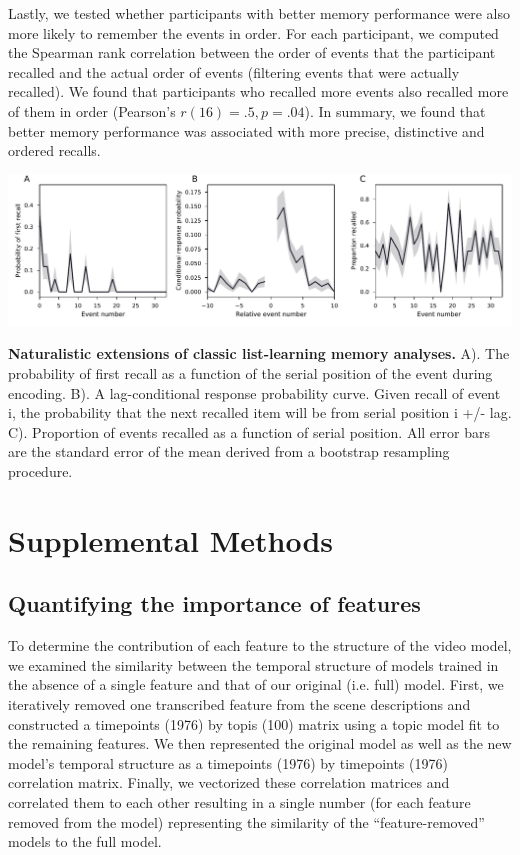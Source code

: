 \documentclass{article}
\begin{document}
Lastly, we tested whether participants with better memory performance were also more likely to remember the events in order.  For each participant, we computed the Spearman rank correlation between the order of events that the participant recalled and the actual order of events (filtering events that were actually recalled).  We found that participants who recalled more events also recalled more of them in order (Pearson's $r(16)=.5, p=.04$). In summary, we found that better memory performance was associated with more precise, distinctive and ordered recalls.

\begin{suppfigure}[t!]
\centering
\includegraphics[width=1\textwidth]{figs/supp3_list_learning.pdf}
\caption{\small \textbf{Naturalistic extensions of classic list-learning memory analyses.} A). The probability of first recall as a function of the serial position of the event during encoding. B). A lag-conditional response probability curve. Given recall of event i, the probability that the next recalled item will be from serial position i +/- lag. C). Proportion of events recalled as a function of serial position. All error bars are the standard error of the mean derived from a bootstrap resampling procedure.}
\label{fig:list-learning}
\end{suppfigure}

\section*{Supplemental Methods}
\subsection{Quantifying the importance of features}
To determine the contribution of each feature to the structure of the video model, we examined the similarity between the temporal structure of models trained in the absence of a single feature and that of our original (i.e. full) model. First, we iteratively removed one transcribed feature from the scene descriptions and constructed a timepoints (1976) by topis (100) matrix using a topic model fit to the remaining features. We then represented the original model as well as the new model’s temporal structure as a timepoints (1976) by timepoints (1976) correlation matrix. Finally, we vectorized these correlation matrices and correlated them to each other resulting in a single number (for each feature removed from the model) representing the similarity of the ``feature-removed'' models to the full model.
\end{document}
